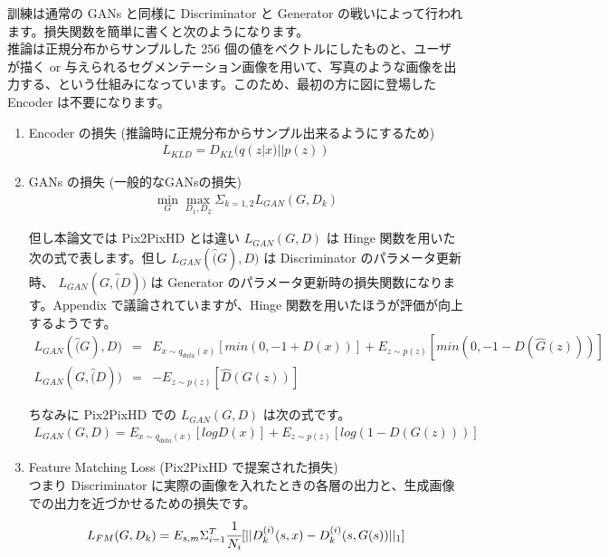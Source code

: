 \documentclass[a4paper, dvipdfmx, 10pt]{article}
\begin{document}
訓練は通常の GANs と同様に Discriminator と Generator の戦いによって行われます。損失関数を簡単に書くと次のようになります。\\

推論は正規分布からサンプルした 256 個の値をベクトルにしたものと、ユーザが描く or 与えられるセグメンテーション画像を用いて、写真のような画像を出力する、という仕組みになっています。このため、最初の方に図に登場した Encoder は不要になります。\\

\begin{enumerate}
\item Encoder の損失 (推論時に正規分布からサンプル出来るようにするため)\\
\begin{eqnarray*}
L_{KLD} = D_{KL} (q(z|x) || p(z))
\end{eqnarray*}

\item GANs  の損失 (一般的なGANsの損失)\\
\begin{eqnarray*}
\min_{G} \max_{D_1, D_2} \Sigma_{k=1,2} L_{GAN}(G, D_k)
\end{eqnarray*}

但し本論文では Pix2PixHD とは違い \(L_{GAN}(G, D)\) は Hinge 関数を用いた 次の式で表します。但し \(L_{GAN}(\hat(G), D)\) は Discriminator のパラメータ更新時、 \(L_{GAN}(G, \hat(D))\) は Generator のパラメータ更新時の損失関数になります。Appendix で議論されていますが、Hinge 関数を用いたほうが評価が向上するようです。\\

\begin{eqnarray*}
L_{GAN}(\hat(G), D) &=& E_{x\sim q_{data}(x)} [min(0, -1 + D(x))] + E_{z \sim p(z)} [min (0, -1 - D(\hat{G}(z)))] \\
L_{GAN}(G, \hat(D)) &=& - E_{z\sim p(z)} [\hat{D}(G(z))]
\end{eqnarray*}

ちなみに Pix2PixHD での \(L_{GAN}(G, D)\) は次の式です。\\

\begin{eqnarray*}
L_{GAN}(G, D) = E_{x\sim q_{data}(x)} [logD(x)] + E_{z\sim p(z)} [log(1 -D(G(z)))]
\end{eqnarray*}

\item Feature Matching Loss (Pix2PixHD で提案された損失)\\
つまり Discriminator に実際の画像を入れたときの各層の出力と、生成画像での出力を近づかせるための損失です。\\
\begin{eqnarray*}
L_{FM}(G, D_k) = E_{s, m} \Sigma^T_{i=1} \cfrac{1}{N_i} [||D^{(i)}_k(s, x) -  D^{(i)}_k(s, G(s))||_1]
\end{eqnarray*}


\end{enumerate}
\end{document}

